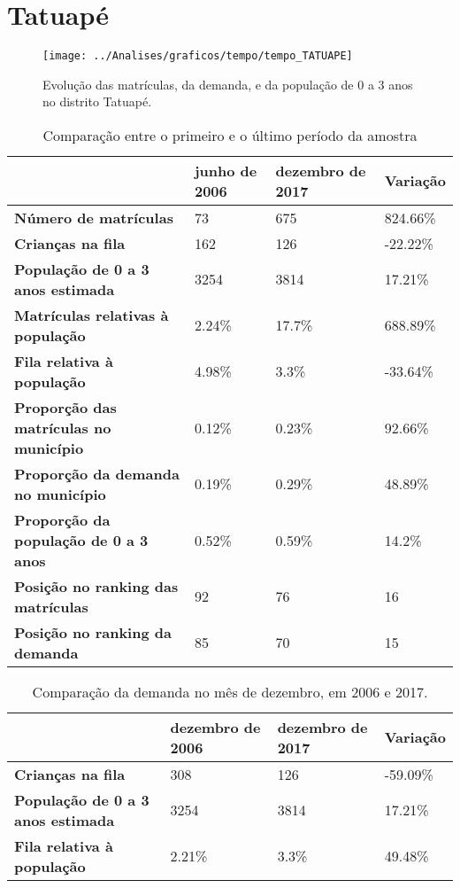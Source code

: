 \section{Tatuapé}
\begin{figure}[H]
\centering
\texttt{[image: ../Analises/graficos/tempo/tempo\_TATUAPE]}
\caption{Evolução das matrículas, da demanda, e da população de 0 a 3 anos no distrito Tatuapé.}
\end{figure}
\begin{table}[H]
\begin{tabular}{|l|l|l|l|}
\hline
\textbf{}                                      & \textbf{junho de 2006}       & \textbf{dezembro de 2017}    & \textbf{Variação} \\ \hline
\textbf{Número de matrículas}                  & 73 & 675 & 824.66\% \\ \hline
\textbf{Crianças na fila}                      & 162 & 126 & -22.22\% \\ \hline
\textbf{População de 0 a 3 anos estimada}      & 3254 & 3814 & 17.21\% \\ \hline
\textbf{Matrículas relativas à população}      & 2.24\% & 17.7\% & 688.89\% \\ \hline
\textbf{Fila relativa à população}             & 4.98\% & 3.3\% & -33.64\% \\ \hline
\textbf{Proporção das matrículas no município} & 0.12\% & 0.23\% & 92.66\% \\ \hline
\textbf{Proporção da demanda no município}     & 0.19\% & 0.29\% & 48.89\% \\ \hline
\textbf{Proporção da população de 0 a 3 anos}  & 0.52\% & 0.59\% & 14.2\% \\ \hline
\textbf{Posição no ranking das matrículas}     & 92 & 76 & 16 \\ \hline
\textbf{Posição no ranking da demanda}         & 85 & 70 & 15 \\ \hline
\end{tabular}
\caption{Comparação entre o primeiro e o último período da amostra}
\end{table}
\begin{table}[H]
\begin{tabular}{|l|l|l|l|}
\hline
\textbf{}                                 & \textbf{dezembro de 2006} & \textbf{dezembro de 2017} & \textbf{Variação} \\ \hline
\textbf{Crianças na fila}                      & 308 & 126 & -59.09\% \\ \hline
\textbf{População de 0 a 3 anos estimada}      & 3254 & 3814 & 17.21\% \\ \hline
\textbf{Fila relativa à população}             & 2.21\% & 3.3\% & 49.48\% \\ \hline
\end{tabular}
\caption{Comparação da demanda no mês de dezembro, em 2006 e 2017.}
\end{table}
